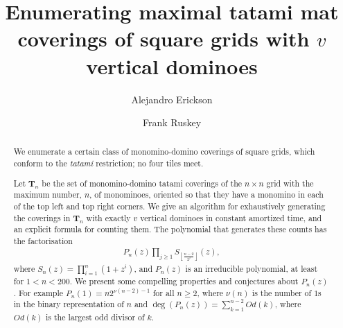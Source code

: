 \documentclass[12pt]{amsart}
\newcommand{\Tn}[1]{\mathbf T_{#1}}
\newcommand{\op}{Od}
\begin{document}
\pagestyle{headings}


\title[$n\times n$ tatami coverings with $v$ vertical
dominoes]{Enumerating maximal tatami mat coverings of square grids
  with $v$ vertical dominoes}%
\author[Erickson]{Alejandro Erickson}

  \author[Ruskey]{Frank Ruskey}
  \address{Department of Computer Science, University of Victoria, V8W
    3P6, Canada}

  \maketitle



\begin{abstract}
  We enumerate a certain class of monomino-domino coverings of square
  grids, which conform to the \emph{tatami} restriction; no four tiles meet.

  Let $\Tn{n}$ be the set of monomino-domino tatami coverings of the
  $n\times n$ grid with the maximum number, $n$, of monominoes,
  oriented so that they have a monomino in each of the top left and
  top right corners.  We give an algorithm for exhaustively generating
  the coverings in $\Tn{n}$ with exactly $v$ vertical dominoes in
  constant amortized time, and an explicit formula for counting them.
  The polynomial that generates these counts has the factorisation
  \begin{align*}
    P_n(z)\prod_{j\ge 1} S_{\left\lfloor \frac{n-2}{2^j}
      \right\rfloor}(z),
  \end{align*}
  where $S_n(z) = \prod_{i=1}^{n} (1 + z^i)$, and $P_n(z)$ is an
  irreducible polynomial, at least for ${1 < n < 200}$.  We present some
  compelling properties and conjectures about $P_n(z)$.  For example
  $P_n(1) = n2^{\nu(n-2)-1}$ for all $n \ge 2$, where $\nu(n)$ is the
  number of $1$s in the binary representation of $n$ and $\deg(P_n(z))
  = \sum_{k=1}^{n-2} \op(k)$, where $\op(k)$ is the largest odd
  divisor of $k$.
 \end{abstract}
\end{document}
